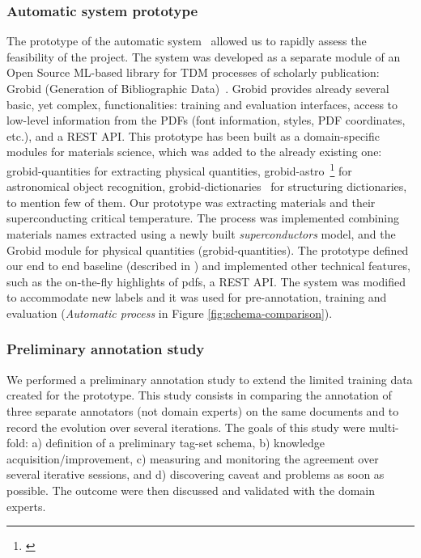 \documentclass[a4paper,10pt]{article}
\begin{document}
\subsubsection{Automatic system prototype}
\label{subsec:automatic-system-prototype}
The prototype of the automatic system~\cite{foppiano2019proposal} allowed us to rapidly assess the feasibility of the project. 
The system was developed as a separate module of an Open Source ML-based library for TDM processes of scholarly publication: Grobid (Generation of Bibliographic Data)~\cite{GROBID}. 
Grobid provides already several basic, yet complex, functionalities: training and evaluation interfaces, access to low-level information from the PDFs (font information, styles, PDF coordinates, etc.), and a REST API. 
This prototype has been built as a domain-specific modules for materials science, which was added to the already existing one: grobid-quantities\cite{foppiano2019quantities} for extracting physical quantities, grobid-astro~\footnote{\url{}} for astronomical object recognition, grobid-dictionaries~\cite{grobid-dictionaries} for structuring dictionaries, to mention few of them. 
Our prototype was extracting materials and their superconducting critical temperature. The process was implemented combining materials names extracted using a newly built \textit{superconductors} model, and the Grobid module for physical quantities (grobid-quantities).
The prototype defined our end to end baseline (described in \cite{foppiano2019proposal}) and implemented other technical features, such as the on-the-fly highlights of pdfs, a REST API. 
The system was modified to accommodate new labels and it was used for pre-annotation, training and evaluation (\textit{Automatic process} in Figure \ref{fig:schema-comparison}).

\subsubsection{Preliminary annotation study}
\label{subsec:preliminary-annotation-study}

We performed a preliminary annotation study to extend the limited training data created for the prototype. This study consists in comparing the annotation of three separate annotators (not domain experts) on the same documents and to record the evolution over several iterations. 
The goals of this study were multi-fold: a) definition of a preliminary tag-set schema, b) knowledge acquisition/improvement, c) measuring and monitoring the agreement over several iterative sessions, and d) discovering caveat and problems as soon as possible. 
The outcome were then discussed and validated with the domain experts. 
\end{document}
